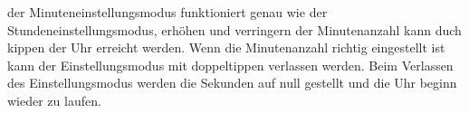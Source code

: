 der Minuteneinstellungsmodus funktioniert genau wie der Stundeneinstellungsmodus, erhöhen und verringern der Minutenanzahl kann duch kippen der Uhr erreicht werden. Wenn die Minutenanzahl richtig eingestellt ist kann der Einstellungsmodus mit doppeltippen verlassen werden. Beim Verlassen des Einstellungsmodus werden die Sekunden auf null gestellt und die Uhr beginn wieder zu laufen.
%
%
